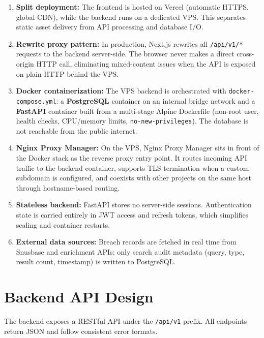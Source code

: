 \begin{enumerate}[nosep]
  \item \textbf{Split deployment:} The frontend is hosted on Vercel (automatic
        HTTPS, global CDN), while the backend runs on a dedicated VPS. This
        separates static asset delivery from API processing and database I/O.
  \item \textbf{Rewrite proxy pattern:} In production, Next.js rewrites all
        \texttt{/api/v1/*} requests to the backend server-side. The browser
        never makes a direct cross-origin HTTP call, eliminating mixed-content
        issues when the API is exposed on plain HTTP behind the VPS.
  \item \textbf{Docker containerization:} The VPS backend is orchestrated with
        \texttt{docker-compose.yml}: a \textbf{PostgreSQL} container on an
        internal bridge network and a \textbf{FastAPI} container built from a
        multi-stage Alpine Dockerfile (non-root user, health checks, CPU/memory
        limits, \texttt{no-new-privileges}). The database is not reachable from
        the public internet.
  \item \textbf{Nginx Proxy Manager:} On the VPS, Nginx Proxy Manager sits in
        front of the Docker stack as the reverse proxy entry point. It routes
        incoming API traffic to the backend container, supports TLS termination
        when a custom subdomain is configured, and coexists with other projects
        on the same host through hostname-based routing.
  \item \textbf{Stateless backend:} FastAPI stores no server-side sessions.
        Authentication state is carried entirely in JWT access and refresh
        tokens, which simplifies scaling and container restarts.
  \item \textbf{External data sources:} Breach records are fetched in real
        time from Snusbase and enrichment APIs; only search audit metadata
        (query, type, result count, timestamp) is written to PostgreSQL.
\end{enumerate}

\section{Backend API Design}
\label{sec:api-design}

The backend exposes a RESTful API under the \texttt{/api/v1} prefix. All
endpoints return JSON and follow consistent error formats.

